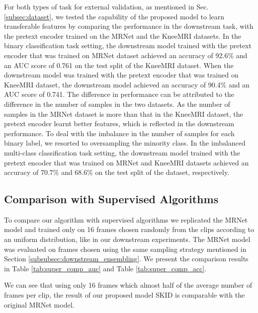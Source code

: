 \documentclass[journal]{IEEEtai}
\begin{document}
\indent For both types of task for external validation, as mentioned in Sec. \ref{subsec:dataset}, we tested the capability of the proposed model to learn transferable features by comparing the performance in the downstream task, with the pretext encoder trained on the MRNet \cite{mrnet} and the KneeMRI \cite{kneemri} datasets. In the binary classification task setting, the downstream model trained with the pretext encoder that was trained on MRNet \cite{mrnet} dataset achieved an accuracy of 92.6\% and an AUC score of 0.761 on the test split of the KneeMRI \cite{kneemri} dataset. When the downstream model was trained with the pretext encoder that was trained on KneeMRI \cite{kneemri} dataset, the downstream model achieved an accuracy of 90.4\% and an AUC score of 0.741. The difference in performance can be attributed to the difference in the number of samples in the two datasets. As the number of samples in the MRNet \cite{mrnet} dataset is more than that in the KneeMRI \cite{kneemri} dataset, the pretext encoder learnt better features, which is reflected in the downstream performance. To deal with the imbalance in the number of samples for each binary label, we resorted to oversampling the minority class. In the imbalanced multi-class classification task setting, the downstream model trained with the pretext encoder that was trained on MRNet \cite{mrnet} and KneeMRI \cite{kneemri} datasets achieved an accuracy of 70.7\% and 68.6\% on the test split of the  dataset, respectively.

\subsection{Comparison with Supervised Algorithms}
\label{subsec:com_super}

\indent To compare our algorithm with supervised algorithms we replicated the MRNet \cite{mrnet} model and trained only on 16 frames chosen randomly from the clips according to an uniform distribution, like in our downstream experiments. The MRNet model was evaluated on frames chosen using the same sampling strategy mentioned in Section \ref{subsubsec:downstream_ensembling}. We present the comparison results in Table \ref{tab:super_comp_auc} and Table \ref{tab:super_comp_acc}.

We can see that using only 16 frames which almost half of the average number of frames per clip, the result of our proposed model SKID is comparable with the original MRNet \cite{mrnet} model. 
\end{document}
